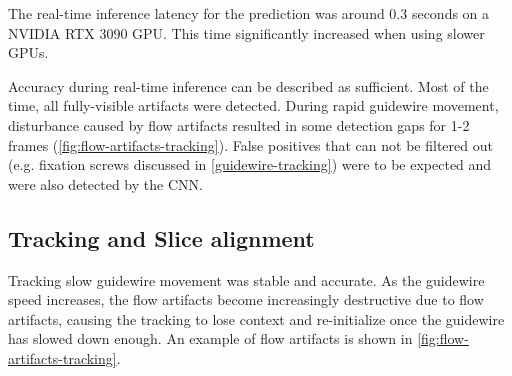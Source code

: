 \documentclass[conference]{IEEEtran}
\begin{document}
The real-time inference latency for the prediction was around 0.3 seconds on a NVIDIA RTX 3090 GPU. This time significantly increased when using slower GPUs. 

Accuracy during real-time inference can be described as sufficient. Most of the time, all fully-visible artifacts were detected. During rapid guidewire movement, disturbance caused by flow artifacts resulted in some detection gaps for 1-2 frames (\autoref{fig:flow-artifacts-tracking}). False positives that can not be filtered out (e.g. fixation screws discussed in \ref{guidewire-tracking}) were to be expected and were also detected by the CNN.

\subsection{Tracking and Slice alignment}
Tracking slow guidewire movement was stable and accurate. As the guidewire speed increases, the flow artifacts become increasingly destructive due to flow artifacts, causing the tracking to lose context and re-initialize once the guidewire has slowed down enough. An example of flow artifacts is shown in \autoref{fig:flow-artifacts-tracking}.
\end{document}
